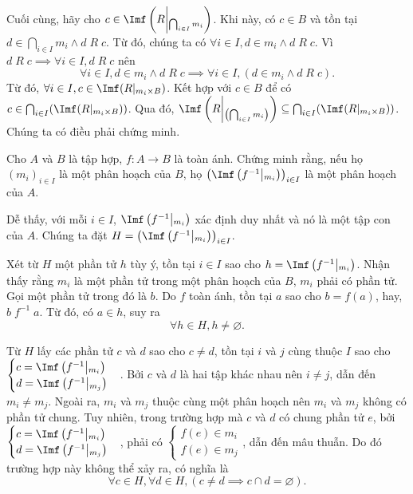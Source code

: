 Cuối cùng, hãy cho $c \in \Imf\left(R \middle|_{\bigcap_{i \in I}m_i}\right)$. Khi này, có $c \in B$ và tồn tại $d \in \bigcap_{i \in I}m_i \land d\;R\;c$. Từ đó, chúng ta có $\forall i \in I, d \in m_i \land d\;R\;c$. Vì $d\;R\;c \implies \forall i \in I, d\;R\;c$ nên \begin{equation*}
   \forall i \in I, d \in m_i \land d\;R\;c \implies \forall i \in I, (d \in m_i \land d\;R\;c).
\end{equation*}
Từ đó, $\forall i \in I, c \in \Imf(R|_{m_i \times B})$. Kết hợp với $c \in B$ để có $c \in \bigcap_{i \in I}(\Imf(R|_{m_i \times B}))$. Qua đó, $\Imf \left(R\middle|_{\left(\bigcap_{i \in I}m_i\right)} \right)\subseteq \bigcap_{i \in I}(\Imf(R|_{m_i \times B}))$. Chúng ta có điều phải chứng minh.

\exercise Cho $A$ và $B$ là tập hợp, $f : A \to B$ là toàn ánh. Chứng minh rằng, nếu họ $(m_i)_{i \in I}$ là một phân hoạch của $B$, họ $\left(\Imf\left(f^{-1}\middle|_{m_i}\right)\right)_{i \in I}$ là một phân hoạch của $A$.

\solution 

Dễ thấy, với mỗi $i \in I$, $\Imf\left(f^{-1}\middle|_{m_i}\right)$ xác định duy nhất và nó là một tập con của $A$. Chúng ta đặt $H = \left(\Imf\left(f^{-1}\middle|_{m_i}\right)\right)_{i \in I}$.

Xét từ $H$ một phần tử $h$ tùy ý, tồn tại $i \in I$ sao cho $h = \Imf\left(f^{-1}\middle|_{m_i}\right)$. Nhận thấy rằng $m_i$ là một phần tử trong một phân hoạch của $B$, $m_i$ phải có phần tử. Gọi một phần tử trong đó là $b$. Do $f$ toàn ánh, tồn tại $a$ sao cho $b = f(a)$, hay, $b\;f^{-1}\;a$. Từ đó, có $a \in h$, suy ra \begin{equation*}
   \forall h \in H, h \neq \varnothing.
\end{equation*}

Từ $H$ lấy các phần tử $c$ và $d$ sao cho $c \neq d$, tồn tại $i$ và $j$ cùng thuộc $I$ sao cho $
   \begin{cases}
      c = \Imf\left(f^{-1}\middle|_{m_i}\right) \\
      d = \Imf\left(f^{-1}\middle|_{m_j}\right)
   \end{cases}
$. Bởi $c$ và $d$ là hai tập khác nhau nên $i \neq j$, dẫn đến $m_i \neq m_j$. Ngoài ra, $m_i$ và $m_j$ thuộc cùng một phân hoạch nên $m_i$ và $m_j$ không có phần tử chung. Tuy nhiên, trong trường hợp mà $c$ và $d$ có chung phần tử $e$, bởi $
   \begin{cases}
      c = \Imf\left(f^{-1}\middle|_{m_i}\right) \\
      d = \Imf\left(f^{-1}\middle|_{m_j}\right)
   \end{cases}
$, phải có $\begin{cases}
   f(e) \in m_i \\
   f(e) \in m_j
\end{cases}$, dẫn đến mâu thuẫn. Do đó trường hợp này không thể xảy ra, có nghĩa là \begin{equation*}
   \forall c \in H, \forall d \in H, (c \neq d \implies c \cap d = \varnothing).
\end{equation*}

